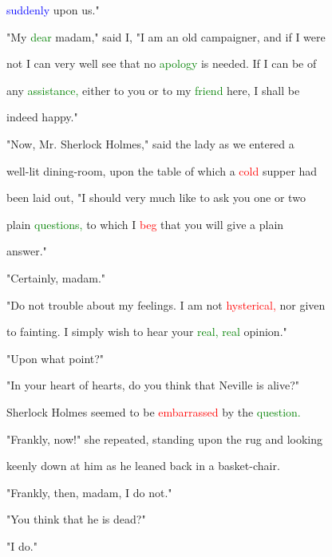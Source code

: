  \textcolor{blue}{suddenly} upon us."



 "My \textcolor{green}{dear} madam," said I, "I am an old campaigner, and if I were

 not I can very well see that no \textcolor{green}{apology} is needed. If I can be of

 any \textcolor{green}{assistance,} either to you or to my \textcolor{green}{friend} here, I shall be

 indeed \textcolor{BurntOrange}{happy."}



 "Now, Mr. Sherlock Holmes," said the lady as we entered a

 well-lit dining-room, upon the table of which a \textcolor{red}{cold} supper had

 been laid out, "I should very much like to ask you one or two

 plain \textcolor{green}{questions,} to which I \textcolor{red}{beg} that you will give a plain

 answer."



 "Certainly, madam."



 "Do not trouble about my \textcolor{BurntOrange}{feelings.} I am not \textcolor{red}{hysterical,} nor given

 to \textcolor{BurntOrange}{fainting.} I simply wish to hear your \textcolor{green}{real,} \textcolor{green}{real} opinion."



 "Upon what point?"



 "In your heart of hearts, do you think that Neville is \textcolor{BurntOrange}{alive?"}



 Sherlock Holmes seemed to be \textcolor{red}{embarrassed} by the \textcolor{green}{question.}

 "Frankly, now!" she repeated, standing upon the rug and looking

 keenly down at him as he leaned back in a basket-chair.



 "Frankly, then, madam, I do not."



 "You think that he is dead?"



 "I do."



